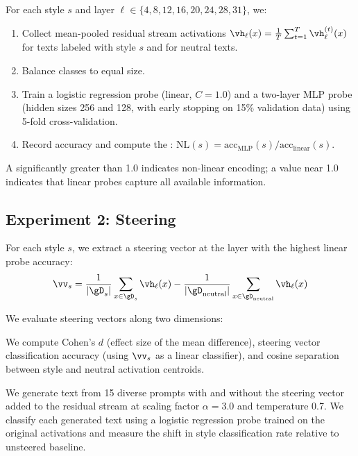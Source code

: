 For each style $s$ and layer $\ell \in \{4, 8, 12, 16, 20, 24, 28, 31\}$, we:
\begin{enumerate}[leftmargin=*,itemsep=0pt,topsep=0pt]
    \item Collect mean-pooled residual stream activations $\vh_\ell(x) = \frac{1}{T} \sum_{t=1}^{T} \vh_\ell^{(t)}(x)$ for texts labeled with style $s$ and for neutral texts.
    \item Balance classes to equal size.
    \item Train a logistic regression probe (linear, $C = 1.0$) and a two-layer MLP probe (hidden sizes 256 and 128, with early stopping on 15\% validation data) using 5-fold cross-validation.
    \item Record accuracy and compute the \nlindex: $\text{NL}(s) = \text{acc}_\text{MLP}(s) / \text{acc}_\text{linear}(s)$.
\end{enumerate}

A \nlindex significantly greater than 1.0 indicates non-linear encoding; a value near 1.0 indicates that linear probes capture all available information.

\subsection{Experiment 2: Steering}
\label{sec:steering}

For each style $s$, we extract a steering vector at the layer with the highest linear probe accuracy:
\begin{equation}
    \vv_s = \frac{1}{|\gD_s|} \sum_{x \in \gD_s} \vh_\ell(x) - \frac{1}{|\gD_\text{neutral}|} \sum_{x \in \gD_\text{neutral}} \vh_\ell(x)
    \label{eq:steering}
\end{equation}

We evaluate steering vectors along two dimensions:

 We compute Cohen's $d$ (effect size of the mean difference), steering vector classification accuracy (using $\vv_s$ as a linear classifier), and cosine separation between style and neutral activation centroids.

 We generate text from 15 diverse prompts with and without the steering vector added to the residual stream at scaling factor $\alpha = 3.0$ and temperature 0.7. We classify each generated text using a logistic regression probe trained on the original activations and measure the shift in style classification rate relative to unsteered baseline.

